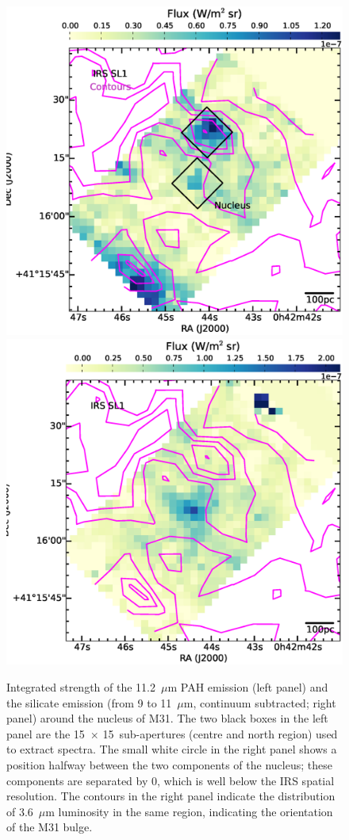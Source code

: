 \begin{figure}
\centering
\includegraphics[scale = 0.25]{./fig10a.eps}
\includegraphics[scale = 0.25]{./fig10b.eps}
\caption{
Integrated strength of the 11.2~$\mu$m PAH emission (left panel) and the silicate emission (from 9 to 11~$\mu$m, continuum subtracted; right panel) 
around the nucleus of M31. 
The  two black boxes in the left panel are the 15\arcsec\ $\times$ 15\arcsec\ sub-apertures (centre and north region) used to extract spectra.  
The small white circle in the right panel shows a position halfway between the two components of the nucleus; these
components are separated by 0, which is well below the IRS spatial resolution. The contours in the right panel indicate
the distribution of 3.6~$\mu$m luminosity in the same region, indicating the orientation of the M31 bulge.
}
\label{nuc11}
\end{figure}


